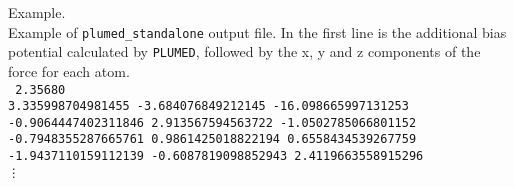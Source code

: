 \documentclass[12pt,fleqn]{report}
\newcommand{\plumed}{{\tt PLUMED}}
\newcommand{\esempio}[1]{
\vspace{10pt}
\begin{flushright}
\colorbox{light-gray}{
   \begin{minipage}{13cm}
       \scriptsize{
{\fontfamily{phv} \fontseries{b}
 \selectfont Example. \\
 \fontseries{m} \selectfont #1 } }
\end{minipage}}
\end{flushright}
\vspace{20pt}
}
\begin{document}
\esempio{Example of {\tt plumed\_standalone} output file. In the first line is the additional bias potential
calculated by \plumed, followed by the x, y and z components of the force for each atom.\\

\vspace{10pt}
{\tt
 2.35680 \\
 3.335998704981455 -3.684076849212145 -16.098665997131253 \\
 -0.9064447402311846 2.913567594563722 -1.0502785066801152 \\
 -0.7948355287665761 0.9861425018822194 0.6558434539267759 \\
 -1.9437110159112139 -0.6087819098852943 2.4119663558915296 \\
\vdots
}
}



\clearpage


\printindex
\end{document}
